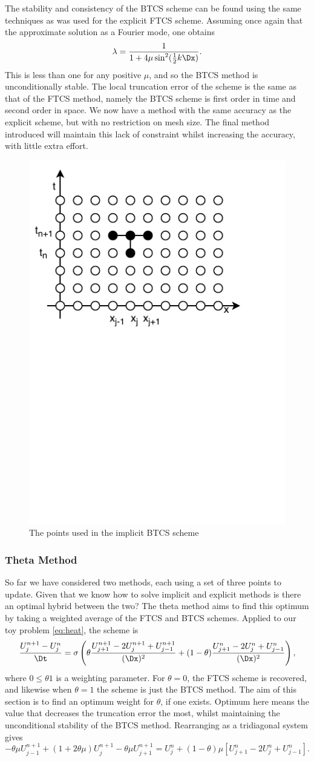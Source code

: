 The stability and consistency of the BTCS scheme can be found using the same techniques as was used for the explicit FTCS scheme. Assuming once again that the approximate solution as a Fourier mode, one obtains
\[\lambda = \frac{1}{1+4\mu \sin^2(\frac{1}{2}k\Dx)}.\]
This is less than one for any positive $\mu$, and so the BTCS method is unconditionally stable. The local truncation error of the scheme is the same as that of the FTCS method, namely the BTCS scheme is first order in time and second order in space. We now have a method with the same accuracy as the explicit scheme, but with no restriction on mesh size. The final method introduced will maintain this lack of constraint whilst increasing the accuracy, with little extra effort.
\begin{figure}
    \centering
    \includegraphics[width=0.5\linewidth, trim={0 5cm 0 0}, clip]{Figures/BTCS}
    \caption[BTCS stencil]{The points used in the implicit BTCS scheme}
    \label{fig:BTCSmesh}
\end{figure}

\subsubsection*{Theta Method}
So far we have considered two methods, each using a set of three points to update. Given that we know how to solve implicit and explicit methods is there an optimal hybrid between the two? The theta method aims to find this optimum by taking a weighted average of the FTCS and BTCS schemes. Applied to our toy problem \eqref{eq:heat}, the scheme is
\[
\frac{U^{n+1}_{j}-U^{n}_{j}}{\Dt} = \sigma\left(\theta \frac{U^{n+1}_{j+1}-2U^{n+1}_{j}+U^{n+1}_{j-1}}{(\Dx)^2}+(1-\theta)\frac{U^{n}_{j+1}-2U^{n}_{j}+U^{n}_{j-1}}{(\Dx)^2}\right),
\]
where $0\leq \theta 1$ is a weighting parameter. For $\theta = 0$, the FTCS scheme is recovered, and likewise when $\theta = 1$ the scheme is just the BTCS method. The aim of this section is to find an optimum weight for $\theta$, if one exists. Optimum here means the value that decreases the truncation error the most, whilst maintaining the unconditional stability of the BTCS method. Rearranging as a tridiagonal system gives
\[
-\theta\mu U^{n+1}_{j-1} + (1+2\theta\mu)U^{n+1}_j - \theta\mu U^{n+1}_{j+1} = U^n_j + (1-\theta)\mu \left[U^n_{j+1} - 2U^n_{j} + U^n_{j-1} \right]. 
\]

